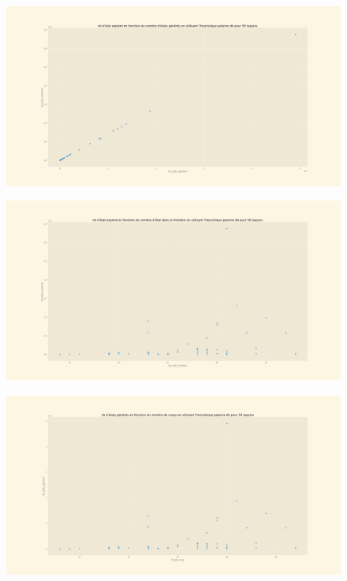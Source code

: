 \documentclass[a4paper, 12pt]{article}
\begin{document}
\begin{figure}[H]
    \centering
    \includegraphics[width=\textwidth]{Taquin 4x4 pa_db nb de noeud explorer en fct du nb detat generer}
\end{figure}
\begin{figure}[H]
    \centering
    \includegraphics[width=\textwidth]{Taquin 4x4 pa_db nb de noeud explorer en fonction du nombre detat dans la frontiere}
\end{figure}
\begin{figure}[H]
    \centering
    \includegraphics[width=\textwidth]{Taquin 4x4 pa_db nb de noeud noeud generer en fonction du nombre dede coups}
\end{figure}
\end{document}
